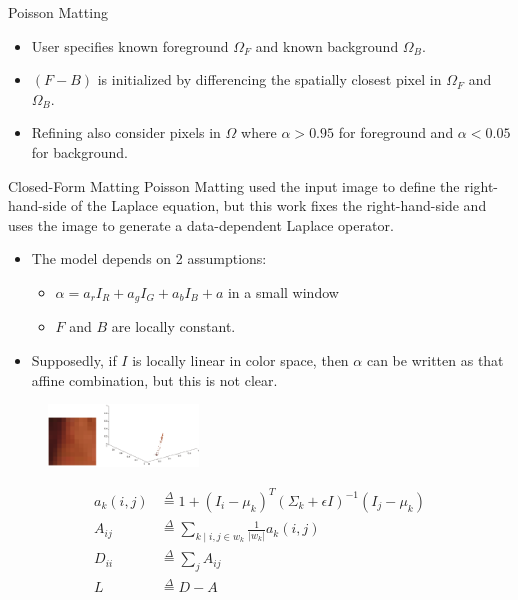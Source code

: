 \documentclass{beamer}
\providecommand{\defeq}{\stackrel{\Delta}{=}}
\begin{document}
\begin{frame}[allowframebreaks]{Poisson Matting \cite{sun2004poisson}}
\begin{figure}
 \end{figure}
 \begin{itemize}
  \item User specifies known foreground $\Omega_F$ and known background
        $\Omega_B$.
  \item $(F-B)$ is initialized by differencing the spatially closest pixel
        in $\Omega_F$ and $\Omega_B$.
  \item Refining also consider pixels in $\Omega$ where $\alpha > 0.95$ for
        foreground and $\alpha < 0.05$ for background.
 \end{itemize}
\end{frame}

\begin{frame}[allowframebreaks]{Closed-Form Matting \cite{levin2008closed}}
 Poisson Matting used the input image to define the right-hand-side of the
 Laplace equation, but this work fixes the right-hand-side and uses the
 image to generate a data-dependent Laplace operator.
 \begin{itemize}
  \item The model depends on 2 assumptions:
  \begin{itemize}
   \item $\alpha = a_r I_R + a_g I_G + a_b I_B + a$ in a small window
   \item $F$ and $B$ are locally constant.
  \end{itemize}
  \item Supposedly, if $I$ is locally linear in color space, then $\alpha$
        can be written as that affine combination, but this is not clear.
 \end{itemize}
 \begin{figure}
  \includegraphics[width=4cm]{images/colorline.png}
 \end{figure}
 \begin{align}
  a_k(i,j) &\defeq 1 + (I_i-\mu_k)^T \left(\Sigma_k + \epsilon I\right)^{-1} (I_j-\mu_k) \\
  A_{ij} &\defeq \sum_{k \mid i,j \in w_k} \frac{1}{\lvert w_k \rvert} a_k(i,j) \\
  D_{ii} &\defeq \sum_j A_{ij} \\
  L &\defeq D-A
 \end{align}
 \begin{itemize}

\end{itemize}
\end{frame}
\end{document}
